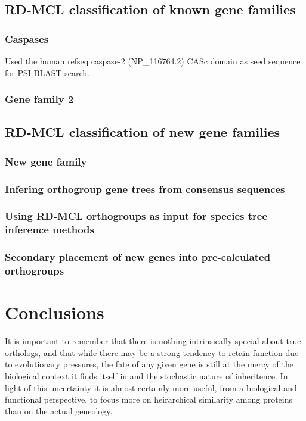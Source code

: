 \documentclass[twocolumn]{bmcart}%
\begin{document}
\subsection{RD-MCL classification of known gene families}
\lipsum[1]

\subsubsection{Caspases}
Used the human refseq caspase-2 (NP\_116764.2) CASc domain as seed sequence for PSI-BLAST search.

\subsubsection{Gene family 2}
\lipsum[1]

\subsection{RD-MCL classification of new gene families}
\lipsum[1]

\subsubsection{New gene family}
\lipsum[2]

\subsubsection{Infering orthogroup gene trees from consensus sequences}
\lipsum[1]

\subsubsection{Using RD-MCL orthogroups as input for species tree inference methods}
\lipsum[1]

\subsubsection{Secondary placement of new genes into pre-calculated orthogroups}
\lipsum[1]

\section{Conclusions}
It is important to remember that there is nothing intrinsically special about true orthologs, and that while there may be a strong tendency to retain function due to evolutionary pressures, the fate of any given gene is still at the mercy of the biological context it finds itself in and the stochastic nature of inheritence. In light of this uncertainty it is almost certainly more useful, from a biological and functional perspective, to focus more on heirarchical similarity among proteins than on the actual geneology.
\end{document}
